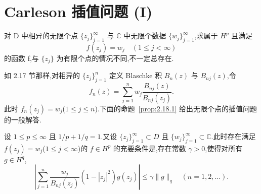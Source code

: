 \section{Carleson 插值问题 (I)}\label{sec:2.18}


对 D 中相异的无限个点 $\{z_{j}\}_{j=1}^{\infty}$ 与 $\mathbb{C}$ 中无限个数据 $\{w_{j}\}_{j=1}^{\infty}$,求属于 $H^{p}$ 且满足
\begin{equation*}
f(z_{j}) = w_{j} \quad (1 \leq j < \infty)
\end{equation*}
的函数 f,与 $\{z_{j}\}$ 为有限个点的情况不同,不一定总存在.

如 2.17 节那样,对相异的 $\{z_{j}\}_{j=1}^{n}$ 定义 Blaschke 积 $B_{n}(z)$ 与 $B_{nj}(z)$,令
\begin{equation*}
f_{n}(z) = \sum_{j=1}^{n} w_{j}\frac{B_{nj}(z)}{B_{nj}(z_{j})}.
\end{equation*}
此时 $f_{n}(z_{j}) = w_{j}$($1 \leq j \leq n$).下面的命题~\ref{prop:2.18.1} 给出无限个点的插值问题的一般解答.

\begin{proposition}\label{prop:2.18.1}
设 $1 \leq p \leq \infty$ 且 $1/p + 1/q = 1$.又设 $\{z_{j}\}_{j=1}^{\infty} \subset D$ 且 $\{w_{j}\}_{j=1}^{\infty} \subset \mathbb{C}$.此时存在满足 $f(z_{j}) = w_{j}$($1 \leq j < \infty$)的 $f \in H^{p}$ 的充要条件是,存在常数 $\gamma > 0$,使得对所有 $g \in H^{q}$,
\begin{equation*}
\left| \sum_{j=1}^{n} \frac{w_{j}}{B_{nj}(z_{j})}(1 - |z_{j}|^{2}) g(z_{j}) \right| \leq \gamma\|g\|_{q} \quad (n = 1, 2, \dots).
\end{equation*}
\end{proposition}

